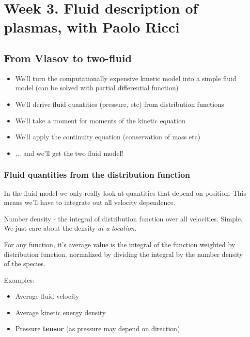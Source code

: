 \documentclass[PlasmaNotes.tex]{subfiles}
\begin{document}
\setcounter{section}{2}
\section{Week 3. Fluid description of plasmas, with Paolo Ricci}
\subsection{From Vlasov to two-fluid}

\begin{itemize}
\item We'll turn the computationally expensive kinetic model into a simple fluid model (can be solved with partial differential function)
\item We'll derive fluid quantities (pressure, etc) from distribution functions
\item We'll take a moment for moments of the kinetic equation
\item We'll apply the continuity equation (conservation of mass etc)
\item ... and we'll get the two fluid model!
\end{itemize}

\subsubsection{Fluid quantities from the distribution function}
In the fluid model we only really look at quantities that depend on position. This means we'll have to integrate out all velocity dependence.

Number density - the integral of distribution function over all velocities. Simple. We just care about the density \emph{at a location}.
\[ \]

For any function, it's average value is the integral of the function weighted by distribution function, normalized by dividing the integral by the number density of the species.
\[ \]

Examples:
\begin{itemize}
\item Average fluid velocity
\[ \]
\item Average kinetic energy density
\[ \]
\item Pressure \textbf{tensor} (as pressure may depend on direction)
\[ \]
\end{itemize}
\end{document}
